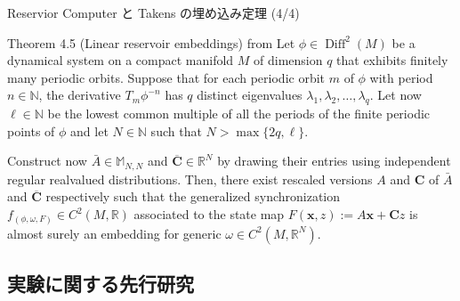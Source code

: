 \begin{frame}{Reservior Computer と Takens の埋め込み定理 \cite{Gregoryeva} (4/4)}
  \begin{block}{Theorem 4.5 (Linear reservoir embeddings) from \cite{Gregoryeva}}
     Let $\phi \in \operatorname{Diff}^2(M)$ be a dynamical system on a compact manifold $M$ of dimension $q$ that exhibits finitely many periodic orbits. Suppose that for each periodic orbit $m$ of $\phi$ with period $n \in \mathbb{N}$, the derivative $T_m \phi^{-n}$ has $q$ distinct eigenvalues $\lambda_1, \lambda_2, \ldots, \lambda_q$. Let now $\ell \in \mathbb{N}$ be the lowest common multiple of all the periods of the finite periodic points of $\phi$ and let $N \in \mathbb{N}$ such that $N>\max \{2 q, \ell\}$.

Construct now $\bar{A} \in \mathbb{M}_{N, N}$ and $\overline{\mathbf{C}} \in \mathbb{R}^N$ by drawing their entries using independent regular realvalued distributions. Then, there exist rescaled versions $A$ and $\mathbf{C}$ of $\bar{A}$ and $\overline{\mathbf{C}}$ respectively such that the generalized synchronization $f_{(\phi, \omega, F)} \in C^2(M, \mathbb{R})$ associated to the state map $F(\mathbf{x}, z):=A \mathbf{x}+\mathbf{C} z$ is almost surely an embedding for generic $\omega \in C^2\left(M, \mathbb{R}^N\right)$.
  \end{block}
\end{frame}

\subsection{実験に関する先行研究}



